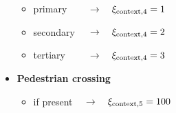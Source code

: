 \begin{itemize}
\begin{itemize}
                        \item primary $\qquad\to\quad\xi_{\rm{context,4}}=1$
                        \item secondary $\,\quad\to\quad\xi_{\rm{context,4}}=2$
                        \item tertiary $\,\qquad\to\quad\xi_{\rm{context,4}}=3$
                    \end{itemize}
                \item \textbf{Pedestrian crossing}
                    \begin{itemize}
                        \item if present $\quad\to\quad\xi_{\rm{context,5}}=100$
                    \end{itemize}
            \end{itemize}
